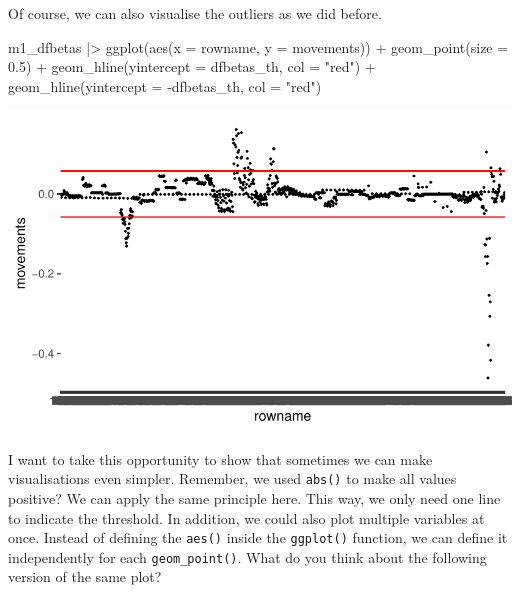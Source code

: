\documentclass[
  letterpaper,
]{krantz}
\makeatletter
\newenvironment{Shaded}{\begin{snugshade}}{\end{snugshade}}
\newcommand{\AttributeTok}[1]{\textcolor[rgb]{0.40,0.45,0.13}{#1}}
\newcommand{\FloatTok}[1]{\textcolor[rgb]{0.68,0.00,0.00}{#1}}
\newcommand{\FunctionTok}[1]{\textcolor[rgb]{0.28,0.35,0.67}{#1}}
\newcommand{\NormalTok}[1]{\textcolor[rgb]{0.00,0.23,0.31}{#1}}
\newcommand{\SpecialCharTok}[1]{\textcolor[rgb]{0.37,0.37,0.37}{#1}}
\newcommand{\StringTok}[1]{\textcolor[rgb]{0.13,0.47,0.30}{#1}}
\newenvironment{kframe}{%
\medskip{}
\setlength{\fboxsep}{.8em}
 \def\at@end@of@kframe{}%
 \ifinner\ifhmode%
  \def\at@end@of@kframe{\end{minipage}}%
  \begin{minipage}{\columnwidth}%
 \fi\fi%
 \def\FrameCommand##1{\hskip\@totalleftmargin \hskip-\fboxsep
 \colorbox{shadecolor}{##1}\hskip-\fboxsep
     \hskip-\linewidth \hskip-\@totalleftmargin \hskip\columnwidth}%
 \MakeFramed {\advance\hsize-\width
   \@totalleftmargin\z@ \linewidth\hsize
   \@setminipage}}%
 {\par\unskip\endMakeFramed%
 \at@end@of@kframe}
\renewenvironment{Shaded}{\begin{kframe}}{\end{kframe}}
\makeatother
\begin{document}
Of course, we can also visualise the outliers as we did before.

\begin{Shaded}
\begin{Highlighting}[]
\NormalTok{m1\_dfbetas }\SpecialCharTok{|\textgreater{}}
  \FunctionTok{ggplot}\NormalTok{(}\FunctionTok{aes}\NormalTok{(}\AttributeTok{x =}\NormalTok{ rowname,}
             \AttributeTok{y =}\NormalTok{ movements)) }\SpecialCharTok{+}
  \FunctionTok{geom\_point}\NormalTok{(}\AttributeTok{size =} \FloatTok{0.5}\NormalTok{) }\SpecialCharTok{+}
  \FunctionTok{geom\_hline}\NormalTok{(}\AttributeTok{yintercept =}\NormalTok{ dfbetas\_th, }\AttributeTok{col =} \StringTok{"red"}\NormalTok{) }\SpecialCharTok{+}
  \FunctionTok{geom\_hline}\NormalTok{(}\AttributeTok{yintercept =} \SpecialCharTok{{-}}\NormalTok{dfbetas\_th, }\AttributeTok{col =} \StringTok{"red"}\NormalTok{)}
\end{Highlighting}
\end{Shaded}

\includegraphics{13_regressions_files/figure-latex/dfbetas-plot-outliers-1.pdf}

I want to take this opportunity to show that sometimes we can make
visualisations even simpler. Remember, we used \texttt{abs()} to make
all values positive? We can apply the same principle here. This way, we
only need one line to indicate the threshold. In addition, we could also
plot multiple variables at once. Instead of defining the \texttt{aes()}
inside the \texttt{ggplot()} function, we can define it independently
for each \texttt{geom\_point()}. What do you think about the following
version of the same plot?
\end{document}
